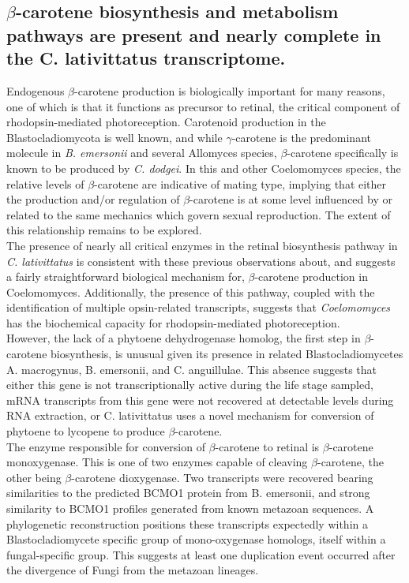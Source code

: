 \subsection*{$\beta$-carotene biosynthesis and metabolism pathways are present and nearly complete in the C. lativittatus transcriptome.}
Endogenous $\beta$-carotene production is biologically important for many reasons, one of which is that it functions as precursor to retinal, the critical component of rhodopsin-mediated photoreception. Carotenoid production in the Blastocladiomycota is well known, and while $\gamma$-carotene is the predominant molecule in \textit{B. emersonii} and several Allomyces species, $\beta$-carotene specifically is known to be produced by \textit{C. dodgei}. In this and other Coelomomyces species, the relative levels of $\beta$-carotene are indicative of mating type, implying that either the production and/or regulation of $\beta$-carotene is at some level influenced by or related to the same mechanics which govern sexual reproduction. The extent of this relationship remains to be explored. \\
\indent The presence of nearly all critical enzymes in the retinal biosynthesis pathway in \textit{C. lativittatus} is consistent with these previous observations about, and suggests a fairly straightforward biological mechanism for, $\beta$-carotene production in Coelomomyces. Additionally, the presence of this pathway, coupled with the identification of multiple opsin-related transcripts, suggests that \textit{Coelomomyces} has the biochemical capacity for rhodopsin-mediated photoreception. \\
\indent However, the lack of a phytoene dehydrogenase homolog, the first step in $\beta$-carotene biosynthesis, is unusual given its presence in related Blastocladiomycetes A. macrogynus, B. emersonii, and C. anguillulae. This absence suggests that either this gene is not transcriptionally active during the life stage sampled, mRNA transcripts from this gene were not recovered at detectable levels during RNA extraction, or C. lativittatus uses a novel mechanism for conversion of phytoene to lycopene to produce $\beta$-carotene. \\
\indent The enzyme responsible for conversion of $\beta$-carotene to retinal is $\beta$-carotene monoxygenase. This is one of two enzymes capable of cleaving $\beta$-carotene, the other being $\beta$-carotene dioxygenase. Two transcripts were recovered bearing similarities to the predicted BCMO1 protein from  B. emersonii, and strong similarity to BCMO1 profiles generated from known metazoan sequences. A phylogenetic reconstruction positions these transcripts expectedly within a Blastocladiomycete specific group of mono-oxygenase homologs, itself within a fungal-specific group. This suggests at least one duplication event occurred after the divergence of Fungi from the metazoan lineages. \\
